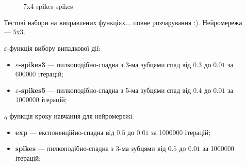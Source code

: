 \documentclass[a4paper,10pt,fleqn]{article}
\begin{document}
\begin{figure}
  \centering
  \subfloat{\texttt{[image: 7-4-s-s\_s3]}}\,
   \\
  \,
  \caption{7x4 spikes spikes}
\end{figure}

\clearpage
\newpage

Тестові набори на виправлених функціях... повне розчарування :). Нейромережа --- 5x3.

$\varepsilon$-функція вибору випадкової дії: 
\begin{itemize}
\item \textbf{$\varepsilon$-spikes3} --- пилкоподібно-спадна з 3-ма зубцями спад від $0.3$ до $0.01$ за 600000 ітерацій;
\item \textbf{$\varepsilon$-spikes5} --- пилкоподібно-спадна з 5-ма зубцями спад від $0.4$ до $0.01$ за 1000000 ітерацій;
\end{itemize}

$\eta$-функція кроку навчання для нейромережі:
\begin{itemize}
\item \textbf{exp} ---    експоненційно-спадна від $0.5$ до $0.01$ за 1000000 ітерацій;
\item \textbf{spikes} --- пилкоподібно-спадна з 3-ма зубцями від $0.5$ до $0.01$ за 1000000 ітерацій;
\end{itemize}
\end{document}
